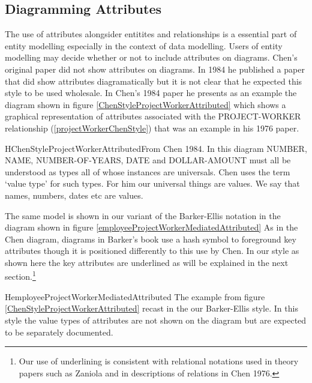 \subsection*{Diagramming Attributes}
\mynote
The use of attributes alongsider entitites and relationships is a essential part of entity modelling especially in the context of data modelling. Users of entity modelling may decide whether or not to include attributes on diagrams. Chen's original paper did not show attributes on diagrams. In 1984
he published a paper that did show attributes diagramatically but it is not clear that he expected this style to be used wholesale. 
\mynote
In Chen's 1984 paper he presents as an example the diagram shown in figure 
\ref{ChenStyleProjectWorkerAttributed} which shows a graphical representation of attributes associated with the PROJECT-WORKER relationship (\ref{projectWorkerChenStyle}) that was an example in his 1976 paper.
\begin{erboxedFigure} {H}{ChenStyleProjectWorkerAttributed}{From Chen 1984. In this diagram NUMBER, NAME, NUMBER-OF-YEARS, DATE and DOLLAR-AMOUNT must all be understood as types all of whose instances are universals. Chen uses the term `value type' for such types. For him our universal things are values. We  say that names, numbers, dates etc are values.}

\end{erboxedFigure}

The same model is shown in our variant of the Barker-Ellis notation
 in the diagram shown in figure \ref{employeeProjectWorkerMediatedAttributed}
As in the Chen diagram, diagrams in Barker's book use a hash symbol to foreground key attributes though it  is positioned differently to this use by Chen. In our style as shown here the key attributes are underlined as will be explained in the next section.\footnote{Our use of underlining is consistent with relational notations used in theory papers such as Zaniola and in descriptions of relations in Chen 1976.}

\begin{erboxedFigure} {H}{employeeProjectWorkerMediatedAttributed}
{The example from figure \ref{ChenStyleProjectWorkerAttributed} recast in the our Barker-Ellis style. 
In this style the value types of attributes are not shown on the diagram but are expected to be 
separately documented. }


\end{erboxedFigure}


 

